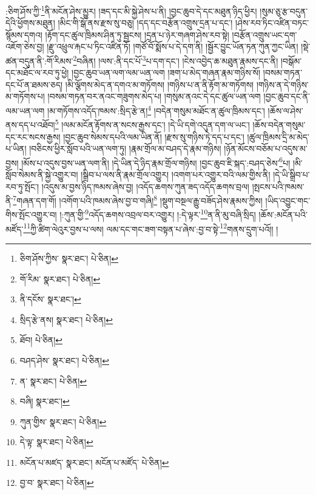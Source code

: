 :ཅིག་ཤོས་ཀྱི་\footnote{ཅིག་ཤོས་ཀྱིས་  སྣར་ཐང་།  པེ་ཅིན། }ནི་མངོན་ཤེས་མྱུར། །ཟད་དང་མི་སྐྱེ་ཤེས་པ་ནི། །བྱང་ཆུབ་དེ་དང་མཐུན་ཉིད་ཕྱིར། །སུམ་ཅུ་རྩ་བདུན་དེའི་ཕྱོགས་མཐུན། །མིང་གི་སྒོ་ནས་རྫས་སུ་བཅུ། །དད་དང་བརྩོན་འགྲུས་དྲན་པ་དང་། །ཤེས་རབ་ཏིང་འཛིན་བཏང་སྙོམས་དགའ། །རྟོག་དང་ཚུལ་ཁྲིམས་ཤིན་ཏུ་སྦྱངས། །དྲན་པ་ཉེར་གཞག་ཤེས་རབ་སྟེ། །བརྩོན་འགྲུས་ཡང་དག་འཇོག་ཅེས་བྱ། །རྫུ་འཕྲུལ་རྐང་པ་ཏིང་འཛིན་ཏོ། །གཙོ་བོ་སྨོས་པ་དེ་དག་ནི། །སྦྱོར་བྱུང་ཡོན་ཏན་ཀུན་ཀྱང་ཡིན། །སྡེ་ཚན་བདུན་ནི་:གོ་རིམས་\footnote{གོ་རིམ་  སྣར་ཐང་།  པེ་ཅིན། }བཞིན། །ལས་:ནི་དང་པོ་\footnote{ནི་དངོས་  སྣར་ཐང་། }པ་དག་དང་། །ངེས་འབྱེད་ཆ་མཐུན་རྣམས་དང་ནི། །བསྒོམ་དང་མཐོང་ལ་རབ་ཏུ་ཕྱེ། །བྱང་ཆུབ་ཡན་ལག་ལམ་ཡན་ལག །ཟག་པ་མེད་གཞན་རྣམ་གཉིས་སོ། །བསམ་གཏན་དང་པོ་ན་ཐམས་ཅད། །མི་ལྕོགས་མེད་ན་དགའ་མ་གཏོགས། །གཉིས་པ་ན་ནི་རྟོག་མ་གཏོགས། །གཉིས་ན་དེ་གཉིས་མ་གཏོགས་པ། །བསམ་གཏན་བར་ནའང་གཟུགས་མེད་པ། །གསུམ་ནའང་དེ་དང་ཚུལ་ཡན་ལག །བྱང་ཆུབ་དང་ནི་ལམ་ཡན་ལག །མ་གཏོགས་འདོད་ཁམས་:སྲིད་རྩེ་ན།\footnote{སྲིད་རྩེ་ནས།  སྣར་ཐང་།  པེ་ཅིན། } །བདེན་གསུམ་མཐོང་ན་ཚུལ་ཁྲིམས་དང་། །ཆོས་ལ་ཤེས་ནས་དད་པ་འཐོབ།\footnote{ཐོབ།  པེ་ཅིན། } །ལམ་མངོན་རྟོགས་ན་སངས་རྒྱས་དང་། །དེ་ཡི་དགེ་འདུན་དག་ལ་ཡང་། །ཆོས་བདེན་གསུམ་དང་རང་སངས་རྒྱས། །བྱང་ཆུབ་སེམས་དཔའི་ལམ་ཡིན་ནོ། །རྫས་སུ་གཉིས་ཏེ་དད་པ་དང་། །ཚུལ་ཁྲིམས་དྲི་མ་མེད་པ་ཡིན། །བཅིངས་ཕྱིར་སློབ་པའི་ཡན་ལག་ཏུ། །རྣམ་གྲོལ་མ་བཤད་དེ་རྣམ་གཉིས། །ཉོན་མོངས་བཅོམ་པ་འདུས་མ་བྱས། །མོས་པ་འདུས་བྱས་ཡན་ལག་ནི། །དེ་ཡིན་དེ་ཉིད་རྣམ་གྲོལ་གཉིས། །བྱང་ཆུབ་ཇི་སྐད་:བཤད་ཅེས་\footnote{བཤད་ཤེས་  སྣར་ཐང་།  པེ་ཅིན། }པ། །མི་སློབ་སེམས་ནི་སྐྱེ་འགྱུར་བ། །སྒྲིབ་པ་ལས་ནི་རྣམ་གྲོལ་འགྱུར། །འགག་པར་འགྱུར་བའི་ལམ་གྱིས་ནི། །དེ་ཡི་སྒྲིབ་པ་རབ་ཏུ་སྤོང་། །འདུས་མ་བྱས་ཉིད་ཁམས་ཞེས་བྱ། །འདོད་ཆགས་ཀུན་ཟད་འདོད་ཆགས་བྲལ། །སྤངས་པའི་ཁམས་ནི་\footnote{ན་  སྣར་ཐང་།  པེ་ཅིན། }གཞན་དག་གོ། །འགོག་པའི་ཁམས་ཞེས་བྱ་བ་གཞི།\footnote{བཞི།  སྣར་ཐང་། } །སྡུག་བསྔལ་རྒྱུ་བཟོད་ཤེས་རྣམས་ཀྱིས། །ཡིད་འབྱུང་གང་གིས་སྤོང་འགྱུར་བ། །:ཀུན་གྱི་\footnote{ཀུན་གྱིས་  སྣར་ཐང་།  པེ་ཅིན། }འདོད་ཆགས་འབྲལ་བར་འགྱུར། །:དེ་ལྟར་\footnote{དེ་ལྟ་  སྣར་ཐང་།  པེ་ཅིན། }ན་ནི་མུ་བཞི་སྲིད། །ཆོས་:མངོན་པའི་མཛོད་\footnote{མངོན་པ་མཛད་  སྣར་ཐང་། མངོན་པ་མཛོད་  པེ་ཅིན། }ཀྱི་ཚིག་ལེའུར་བྱས་པ་ལས། ལམ་དང་གང་ཟག་བསྟན་པ་ཞེས་:བྱ་བ་སྟེ་\footnote{བྱ་བ་  སྣར་ཐང་།  པེ་ཅིན། }གནས་དྲུག་པའོ།། །
